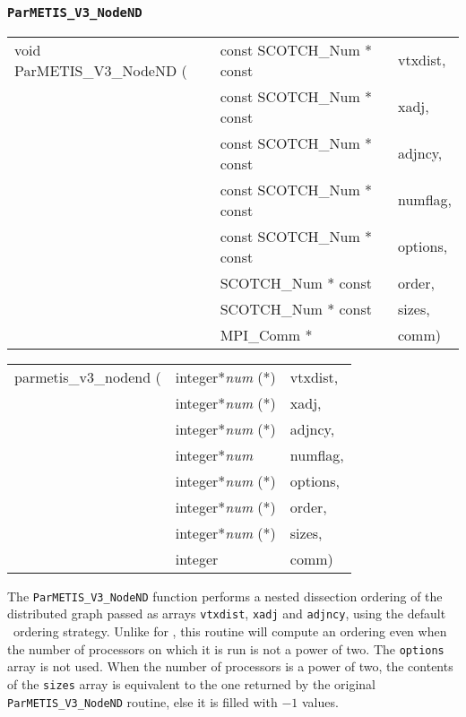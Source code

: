 \subsubsection{{\tt ParMETIS\_V3\_NodeND}}

\begin{itemize}
\progsyn

{\tt\begin{tabular}{l@{}ll}
void ParMETIS\_V3\_NodeND ( & const SCOTCH\_Num * const & vtxdist, \\
                            & const SCOTCH\_Num * const & xadj, \\
                            & const SCOTCH\_Num * const & adjncy, \\
                            & const SCOTCH\_Num * const & numflag, \\
                            & const SCOTCH\_Num * const & options, \\
                            & SCOTCH\_Num * const       & order, \\
                            & SCOTCH\_Num * const       & sizes, \\
                            & MPI\_Comm *               & comm)
\end{tabular}}

{\tt\begin{tabular}{l@{}ll}
parmetis\_v3\_nodend ( & integer*{\it num} (*) & vtxdist, \\
                       & integer*{\it num} (*) & xadj, \\
                       & integer*{\it num} (*) & adjncy, \\
                       & integer*{\it num}     & numflag, \\
                       & integer*{\it num} (*) & options, \\
                       & integer*{\it num} (*) & order, \\
                       & integer*{\it num} (*) & sizes, \\
                       & integer               & comm)
\end{tabular}}

\progdes

The {\tt ParMETIS\_V3\_NodeND} function performs a nested dissection
ordering of the distributed graph passed as arrays {\tt vtxdist},
{\tt xadj} and {\tt adjncy}, using the default \ptscotch\ ordering
strategy. Unlike for \parmetis, this routine will compute an ordering
even when the number of processors on which it is run is not a power
of two. The {\tt options} array is not used. When the number of
processors is a power of two, the contents of the {\tt sizes} array is
equivalent to the one returned by the original {\tt ParMETIS\_V3\_NodeND}
routine, else it is filled with $-1$ values.


\end{itemize}
